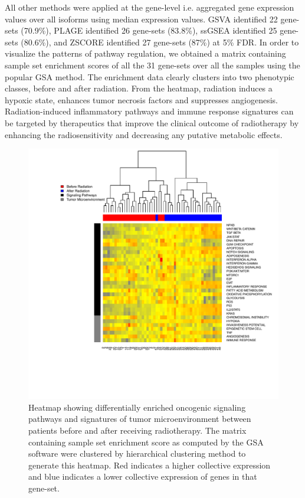 \documentclass[hidelinks,11pt]{article}
\begin{document}
All other methods were applied at the gene-level i.e. aggregated gene expression values over all isoforms using median expression values. GSVA identified 22 gene-sets (70.9\%), PLAGE identified 26 gene-sets (83.8\%), ssGSEA identified 25 gene-sets (80.6\%), and ZSCORE identified 27 gene-sets (87\%) at 5\% FDR. In order to visualize the patterns of pathway regulation, we obtained a matrix containing sample set enrichment scores of all the 31 gene-sets over all the samples using the popular GSA method. The enrichment data clearly clusters into two phenotypic classes, before and after radiation. From the heatmap, radiation induces a hypoxic state, enhances tumor necrosis factors and suppresses angiogenesis. Radiation-induced inflammatory pathways and immune response signatures can be targeted by therapeutics that improve the clinical outcome of radiotherapy by enhancing the radiosensitivity and decreasing any putative metabolic effects. 

\begin{figure}[!ht]
\centering
\includegraphics[width=\textwidth]{Figure4.pdf}
\caption{Heatmap showing differentially enriched oncogenic signaling pathways and signatures of tumor microenvironment between patients before and after receiving radiotherapy. The matrix containing sample set enrichment score as computed by the GSA software were clustered by hierarchical clustering method to generate this heatmap. Red indicates a higher collective expression and blue indicates a lower collective expression of genes in that gene-set.}
\end{figure}
\end{document}
